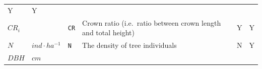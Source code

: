 \documentclass[]{book}
\begin{document}
\begin{longtable}[]{@{}llllll@{}}
\begin{minipage}[t]{0.07\columnwidth}
Y\strut
\end{minipage} & \begin{minipage}[t]{0.07\columnwidth}\raggedright\strut
Y\strut
\end{minipage}\tabularnewline
\begin{minipage}[t]{0.10\columnwidth}\raggedright\strut
\(CR_i\)\strut
\end{minipage} & \begin{minipage}[t]{0.09\columnwidth}\raggedright\strut
\strut
\end{minipage} & \begin{minipage}[t]{0.06\columnwidth}\raggedright\strut
\texttt{CR}\strut
\end{minipage} & \begin{minipage}[t]{0.43\columnwidth}\raggedright\strut
Crown ratio (i.e.~ratio between crown length and total height)\strut
\end{minipage} & \begin{minipage}[t]{0.07\columnwidth}\raggedright\strut
Y\strut
\end{minipage} & \begin{minipage}[t]{0.07\columnwidth}\raggedright\strut
Y\strut
\end{minipage}\tabularnewline
\begin{minipage}[t]{0.10\columnwidth}\raggedright\strut
\(N\)\strut
\end{minipage} & \begin{minipage}[t]{0.09\columnwidth}\raggedright\strut
\(ind · ha^{-1}\)\strut
\end{minipage} & \begin{minipage}[t]{0.06\columnwidth}\raggedright\strut
\texttt{N}\strut
\end{minipage} & \begin{minipage}[t]{0.43\columnwidth}\raggedright\strut
The density of tree individuals\strut
\end{minipage} & \begin{minipage}[t]{0.07\columnwidth}\raggedright\strut
N\strut
\end{minipage} & \begin{minipage}[t]{0.07\columnwidth}\raggedright\strut
Y\strut
\end{minipage}\tabularnewline
\begin{minipage}[t]{0.10\columnwidth}\raggedright\strut
\(DBH\)\strut
\end{minipage} & \begin{minipage}[t]{0.09\columnwidth}\raggedright\strut
\(cm\)\strut

\end{minipage}
\end{longtable}
\end{document}
